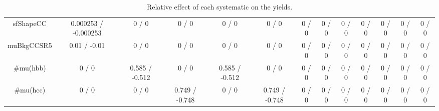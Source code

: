 \documentclass[10pt]{article}
\begin{document}
\begin{table}[htbp]
\begin{center}
\begin{tabular}{|c|c|c|c|c|c|c|c|c|c|c|c|c|}
  sfShapeCC & 0.000253 / -0.000253 & 0 / 0 & 0 / 0 & 0 / 0 & 0 / 0 & 0 / 0 & 0 / 0 & 0 / 0 & 0 / 0 & 0 / 0 & 0 / 0 & 0 / 0 \\ 
  muBkgCCSR5 & 0.01 / -0.01 & 0 / 0 & 0 / 0 & 0 / 0 & 0 / 0 & 0 / 0 & 0 / 0 & 0 / 0 & 0 / 0 & 0 / 0 & 0 / 0 & 0 / 0 \\ 
  #mu(hbb) & 0 / 0 & 0.585 / -0.512 & 0 / 0 & 0.585 / -0.512 & 0 / 0 & 0 / 0 & 0 / 0 & 0 / 0 & 0 / 0 & 0 / 0 & 0 / 0 & 0 / 0 \\ 
  #mu(hcc) & 0 / 0 & 0 / 0 & 0.749 / -0.748 & 0 / 0 & 0.749 / -0.748 & 0 / 0 & 0 / 0 & 0 / 0 & 0 / 0 & 0 / 0 & 0 / 0 & 0 / 0 \\ 
\hline 
\end{tabular} 
\caption{Relative effect of each systematic on the yields.} 
\end{center} 
\end{table} 
\end{document}

